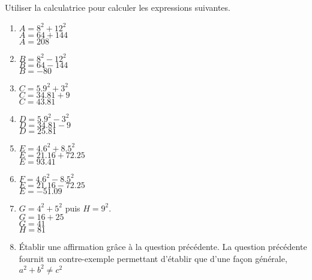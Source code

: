     Utiliser la calculatrice pour calculer les expressions suivantes.

    \begin{enumerate}
        \item $A=8^2+12^2$\\{\red $A=64+144$\\$A=208$}
        \item $B=8^2-12^2$\\{\red $B=64-144$\\$B=-80$}
        \item $C=\num{5.9}^2+3^2$\\{\red $C=\num{34.81}+9$\\$C=\num{43.81}$}
        \item $D=\num{5.9}^2-3^2$\\{\red $D=\num{34.81}-9$\\$D=\num{25.81}$}
        \item $E=\num{4.6}^2+\num{8.5}^2$\\{\red $E=\num{21.16}+\num{72.25}$\\$E=\num{93.41}$}
        \item $F=\num{4.6}^2-\num{8.5}^2$\\{\red $E=\num{21.16}-\num{72.25}$\\$E=\num{-51.09}$}
        \item $G=4^2+5^2$ puis $H=9^2$.\\
        {\red
            $G=16+25$\\$G=41$\\$H=81$
        }
        \item Établir une affirmation grâce à la question précédente.
        {\red La question précédente fournit un contre-exemple permettant d'établir que d'une façon générale, $a^2+b^2\neq c^2$}
    \end{enumerate}
